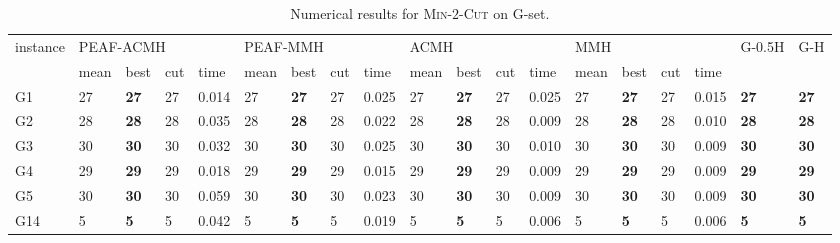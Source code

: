 \documentclass[12pt, a4paper]{article}%
\renewcommand{\arraystretch}{1.3}
\numberwithin{equation}{section}
\theoremstyle{plain}
\begin{document}
			{
				\scriptsize
				\setlength{\tabcolsep}{8.5pt}
				\renewcommand{\arraystretch}{1.2}
				\begin{landscape}
					\begin{longtable}{lllllllllllllllllll}
						\caption[Results for \textsc{Min}-$2$-\textsc{Cut}]{Numerical results for \textsc{Min}-$2$-\textsc{Cut} on G-set.}
						\label{tab::min2cut}\\
						\hline
						\multirow{2}{*}{instance} & \multicolumn{4}{l}{PEAF-ACMH}               & \multicolumn{4}{l}{PEAF-MMH}                & \multicolumn{4}{l}{ACMH}                   & \multicolumn{4}{l}{MMH}                    & \multirow{2}{*}{G-0.5H} & \multirow{2}{*}{G-H} \\ \cline{2-17}
						& mean    & best           & cut   & time      & mean    & best           & cut   & time     & mean    & best           & cut   & time      & mean    & best           & cut   & time     &                         &                      \\ \hline
						G1                        & 27   & \textbf{27} & 27  & 0.014 & 27   & \textbf{27} & 27  & 0.025 & 27   & \textbf{27} & 27  & 0.025 & 27   & \textbf{27} & 27  & 0.015 & \textbf{27}             & \textbf{27}          \\
						G2                        & 28   & \textbf{28} & 28  & 0.035 & 28   & \textbf{28} & 28  & 0.022 & 28   & \textbf{28} & 28  & 0.009 & 28   & \textbf{28} & 28  & 0.010 & \textbf{28}             & \textbf{28}          \\
						G3                        & 30   & \textbf{30} & 30  & 0.032 & 30   & \textbf{30} & 30  & 0.025 & 30   & \textbf{30} & 30  & 0.010 & 30   & \textbf{30} & 30  & 0.009 & \textbf{30}             & \textbf{30}          \\
						G4                        & 29   & \textbf{29} & 29  & 0.018 & 29   & \textbf{29} & 29  & 0.015 & 29   & \textbf{29} & 29  & 0.009 & 29   & \textbf{29} & 29  & 0.009 & \textbf{29}             & \textbf{29}          \\
						G5                        & 30   & \textbf{30} & 30  & 0.059 & 30   & \textbf{30} & 30  & 0.023 & 30   & \textbf{30} & 30  & 0.009 & 30   & \textbf{30} & 30  & 0.009 & \textbf{30}             & \textbf{30}          \\
						G14                       & 5    & \textbf{5}  & 5   & 0.042 & 5    & \textbf{5}  & 5   & 0.019 & 5    & \textbf{5}  & 5   & 0.006 & 5    & \textbf{5}  & 5   & 0.006 & \textbf{5}              & \textbf{5}           \\

\end{longtable}
\end{landscape}}
\end{document}
